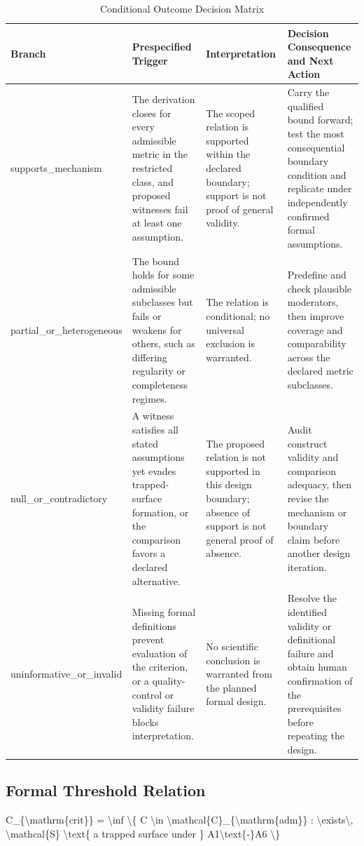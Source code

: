 \documentclass[conference]{IEEEtran}
\begin{document}
\begin{table}[htbp]
\centering
\footnotesize
\setlength{\tabcolsep}{3pt}
\renewcommand{\arraystretch}{1.12}
\caption{Conditional Outcome Decision Matrix}
\label{tab:expected-outcomes-eo-02}
\begin{tabular}{|p{}|p{}|p{}|p{}|}
\hline
Branch & Prespecified Trigger & Interpretation & Decision Consequence and Next Action \\\hline
supports\_mechanism & The derivation closes for every admissible metric in the restricted class, and proposed witnesses fail at least one assumption. & The scoped relation is supported within the declared boundary; support is not proof of general validity. & Carry the qualified bound forward; test the most consequential boundary condition and replicate under independently confirmed formal assumptions. \\\hline
partial\_or\_heterogeneous & The bound holds for some admissible subclasses but fails or weakens for others, such as differing regularity or completeness regimes. & The relation is conditional; no universal exclusion is warranted. & Predefine and check plausible moderators, then improve coverage and comparability across the declared metric subclasses. \\\hline
null\_or\_contradictory & A witness satisfies all stated assumptions yet evades trapped-surface formation, or the comparison favors a declared alternative. & The proposed relation is not supported in this design boundary; absence of support is not general proof of absence. & Audit construct validity and comparison adequacy, then revise the mechanism or boundary claim before another design iteration. \\\hline
uninformative\_or\_invalid & Missing formal definitions prevent evaluation of the criterion, or a quality-control or validity failure blocks interpretation. & No scientific conclusion is warranted from the planned formal design. & Resolve the identified validity or definitional failure and obtain human confirmation of the prerequisites before repeating the design. \\\hline
\end{tabular}
\end{table}

\subsection{Formal Threshold Relation}
C\_\{\textbackslash{}mathrm\{crit\}\} = \textbackslash{}inf \textbackslash{}\{ C \textbackslash{}in \textbackslash{}mathcal\{C\}\_\{\textbackslash{}mathrm\{adm\}\} : \textbackslash{}exists\textbackslash{}, \textbackslash{}mathcal\{S\} \textbackslash{}text\{ a trapped surface under \} A1\textbackslash{}text\{-\}A6 \textbackslash{}\}
\end{document}
